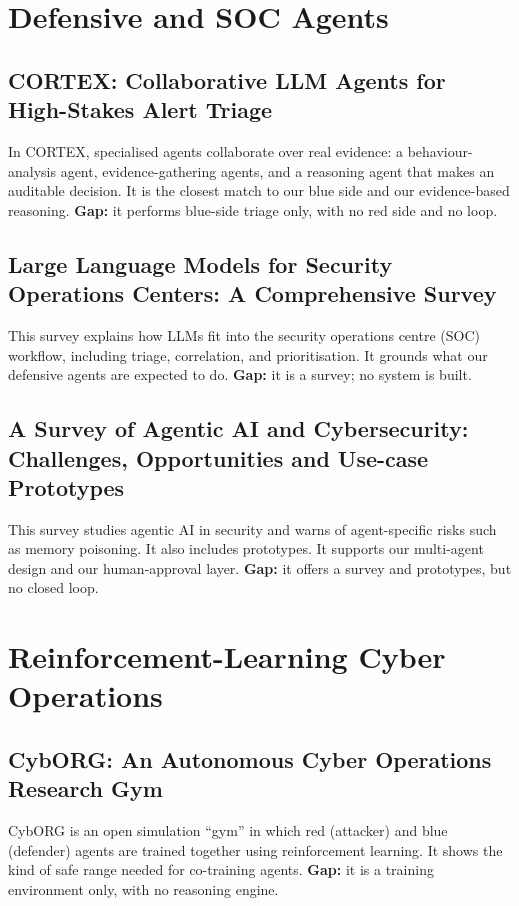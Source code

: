 \section{Defensive and SOC Agents}

\subsection{CORTEX: Collaborative LLM Agents for High-Stakes Alert Triage}
In CORTEX, specialised agents collaborate over real evidence: a
behaviour-analysis agent, evidence-gathering agents, and a reasoning agent that
makes an auditable decision. It is the closest match to our blue side and our
evidence-based reasoning. \textbf{Gap:} it performs blue-side triage only, with no
red side and no loop.

\subsection{Large Language Models for Security Operations Centers: A Comprehensive Survey}
This survey explains how LLMs fit into the security operations centre (SOC)
workflow, including triage, correlation, and prioritisation. It grounds what our
defensive agents are expected to do. \textbf{Gap:} it is a survey; no system is
built.

\subsection{A Survey of Agentic AI and Cybersecurity: Challenges, Opportunities and Use-case Prototypes}
This survey studies agentic AI in security and warns of agent-specific risks
such as memory poisoning. It also includes prototypes. It supports our
multi-agent design and our human-approval layer. \textbf{Gap:} it offers a survey
and prototypes, but no closed loop.

\section{Reinforcement-Learning Cyber Operations}

\subsection{CybORG: An Autonomous Cyber Operations Research Gym}
CybORG is an open simulation ``gym'' in which red (attacker) and blue (defender)
agents are trained together using reinforcement learning. It shows the kind of
safe range needed for co-training agents. \textbf{Gap:} it is a training
environment only, with no reasoning engine.

